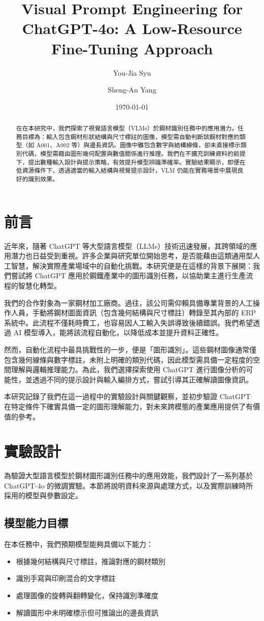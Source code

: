 \documentclass[UTF8, fontset=none]{ctexart}
\title{Visual Prompt Engineering for ChatGPT-4o: A Low-Resource Fine-Tuning Approach}
\author[1]{You-Jia Syu}
\author[1]{Sheng-An Yang}
\affil[1]{Independent Researcher}
\date{\today}
\begin{document}
\maketitle

\begin{abstract}
在在本研究中，我們探索了視覺語言模型（VLMs）於鋼材識別任務中的應用潛力。任務目標為：輸入包含鋼材形狀結構與尺寸標註的圖像，模型需自動判斷該鋼材對應的類型（如 A001、A002 等）與邊長資訊。圖像中雖包含數字與結構線條，卻未直接標示類別代碼，模型需藉由圖形幾何配置與數值關係進行推理。我們在不擴充訓練資料的前提下，提出數種輸入設計與提示策略，有效提升模型辨識準確率。實驗結果顯示，即便在低資源條件下，透過適當的輸入結構與視覺提示設計，VLM 仍能在實務場景中展現良好的識別效果。
\end{abstract}

\section{前言}
近年來，隨著 ChatGPT \cite{openai2024gpt4o}等大型語言模型（LLMs）技術迅速發展，其跨領域的應用潛力也日益受到重視。許多企業與研究單位開始思考，是否能藉由這類通用型人工智慧，解決實際產業場域中的自動化挑戰。本研究便是在這樣的背景下展開：我們嘗試將 ChatGPT 應用於鋼鐵產業中的圖形識別任務，以協助業主進行生產流程的智慧化轉型。

我們的合作對象為一家鋼材加工廠商。過往，該公司需仰賴具備專業背景的人工操作人員，手動將鋼材圖面資訊（包含幾何結構與尺寸標註）轉錄至其內部的 ERP 系統中。此流程不僅耗時費工，也容易因人工輸入失誤導致後續錯誤。我們希望透過 AI 模型導入，能將該流程自動化，以降低成本並提升資料正確性。

然而，自動化流程中最具挑戰性的一步，便是「圖形識別」。這些鋼材圖像通常僅包含幾何線條與數字標註，未附上明確的類別代碼，因此模型需具備一定程度的空間理解與邏輯推理能力。為此，我們選擇探索使用 ChatGPT 進行圖像分析的可能性，並透過不同的提示設計與輸入編排方式，嘗試引導其正確解讀圖像資訊。

本研究記錄了我們在這一過程中的實驗設計與關鍵觀察，並初步驗證 ChatGPT 在特定條件下確實具備一定的圖形理解能力，對未來跨模態的產業應用提供了有價值的參考。
\section{實驗設計}

為驗證大型語言模型於鋼材圖形識別任務中的應用效能，我們設計了一系列基於 ChatGPT-4o 的微調實驗。本節將說明資料來源與處理方式，以及實際訓練時所採用的模型與參數設定。
\subsection{模型能力目標}
在本任務中，我們預期模型能夠具備以下能力：
\begin{itemize}
  \item 根據幾何結構與尺寸標註，推論對應的鋼材類別
  \item 識別手寫與印刷混合的文字標註
  \item 處理圖像的旋轉與翻轉變化，保持識別準確度
  \item 解讀圖形中未明確標示但可推論出的邊長資訊
\end{itemize}
\end{document}

